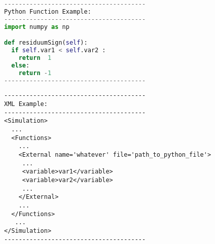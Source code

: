 \begin{lstlisting}[language=python]
---------------------------------------
Python Function Example:
---------------------------------------
import numpy as np

def residuumSign(self):
  if self.var1 < self.var2 : 
    return  1
  else: 
    return -1
---------------------------------------
\end{lstlisting} 

\begin{lstlisting}[style=XML]
---------------------------------------
XML Example:
---------------------------------------
<Simulation>
  ...
  <Functions>
    ...
    <External name='whatever' file='path_to_python_file'>
     ...
     <variable>var1</variable>
     <variable>var2</variable>
     ...
    </External>
    ...
  </Functions>
   ...
</Simulation>
---------------------------------------
\end{lstlisting}



